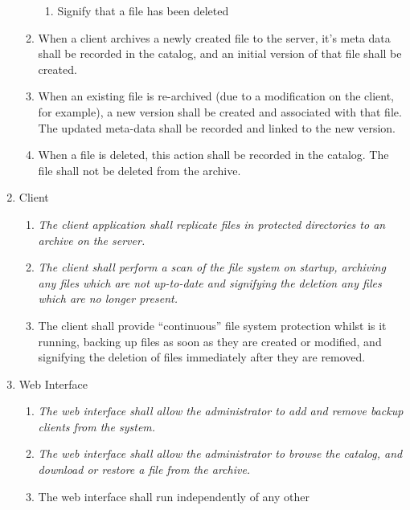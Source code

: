 \begin{enumerate}
\begin{enumerate}
\begin{enumerate}
                    \item Signify that a file has been deleted
                \end{enumerate}
            \item When a client archives a newly created file to the server,
                it's meta data shall be recorded in the catalog, and an initial
                version of that file shall be created.
            \item When an existing file is re-archived (due to a modification
                on the client, for example), a new version shall be created and
                associated with that file. The updated meta-data shall be
                recorded and linked to the new version.
            \item When a file is deleted, this action shall be recorded in the
                catalog. The file shall not be deleted from the archive.
        \end{enumerate}
    \item Client
        \begin{enumerate}
            \item \emph{The client application shall replicate files in
                protected directories to an archive on the server.}
            \item \emph{The client shall perform a scan of the file system on
                startup, archiving any files which are not up-to-date and
                signifying the deletion any files which are no longer present.}
            \item The client shall provide ``continuous'' file system
                protection whilst is it running, backing up files as soon as
                they are created or modified, and signifying the deletion of
                files immediately after they are removed.
        \end{enumerate}
    \item Web Interface
        \begin{enumerate}
            \item \emph{The web interface shall allow the administrator to add
                and remove backup clients from the system.}
            \item \emph{The web interface shall allow the administrator to
                browse the catalog, and download or restore a file from the
                archive.}
            \item The web interface shall run independently of any other

\end{enumerate}
\end{enumerate}
